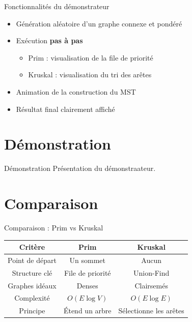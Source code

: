 \documentclass[10pt]{beamer}
\begin{document}
\begin{frame}{Fonctionnalités du démonstrateur}

\begin{itemize}
    \item Génération aléatoire d’un graphe connexe et pondéré
    \item Exécution \textbf{pas à pas}
    \begin{itemize}
        \item Prim : visualisation de la file de priorité
        \item Kruskal : visualisation du tri des arêtes
    \end{itemize}
    \item Animation de la construction du MST
    \item Résultat final clairement affiché
\end{itemize}

\end{frame}

\section{Démonstration}

\begin{frame}{Démonstration}
Présentation du démonstraateur.
\end{frame}

\section{Comparaison}

\begin{frame}{Comparaison : Prim vs Kruskal}

\begin{table}[]
\centering
\begin{tabular}{|c|c|c|}
\hline
\textbf{Critère} & \textbf{Prim} & \textbf{Kruskal} \\ \hline
Point de départ & Un sommet & Aucun \\ \hline
Structure clé & File de priorité & Union-Find \\ \hline
Graphes idéaux & Denses & Clairsemés \\ \hline
Complexité & $O(E\log V)$ & $O(E\log E)$ \\ \hline
Principe & Étend un arbre & Sélectionne les arêtes \\ \hline
\end{tabular}
\end{table}

\end{frame}
\end{document}
